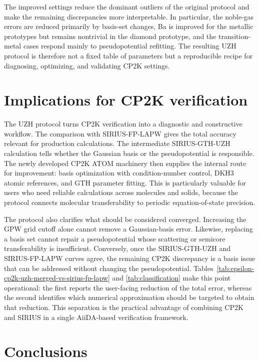 \documentclass[aps,prb,reprint,amsmath,amssymb,superscriptaddress,longbibliography,floatfix]{revtex4-2}
\begin{document}
The improved settings reduce the dominant outliers of the original protocol and make the remaining discrepancies more interpretable. In particular, the noble-gas errors are reduced primarily by basis-set changes, Ba is improved for the metallic prototypes but remains nontrivial in the diamond prototype, and the transition-metal cases respond mainly to pseudopotential refitting. The resulting UZH protocol is therefore not a fixed table of parameters but a reproducible recipe for diagnosing, optimizing, and validating CP2K settings.

\section{Implications for CP2K verification}

The UZH protocol turns CP2K verification into a diagnostic and constructive workflow. The comparison with SIRIUS-FP-LAPW gives the total accuracy relevant for production calculations. The intermediate SIRIUS-GTH-UZH calculation tells whether the Gaussian basis or the pseudopotential is responsible. The newly developed CP2K ATOM machinery then supplies the internal route for improvement: basis optimization with condition-number control, DKH3 atomic references, and GTH parameter fitting. This is particularly valuable for users who need reliable calculations across molecules and solids, because the protocol connects molecular transferability to periodic equation-of-state precision.

The protocol also clarifies what should be considered converged. Increasing the GPW grid cutoff alone cannot remove a Gaussian-basis error. Likewise, replacing a basis set cannot repair a pseudopotential whose scattering or semicore transferability is insufficient. Conversely, once the SIRIUS-GTH-UZH and SIRIUS-FP-LAPW curves agree, the remaining CP2K discrepancy is a basis issue that can be addressed without changing the pseudopotential. Tables~\ref{tab:epsilon-cp2k-uzh-merged-vs-sirius-fp-lapw} and \ref{tab:classification} make this point operational: the first reports the user-facing reduction of the total error, whereas the second identifies which numerical approximation should be targeted to obtain that reduction. This separation is the practical advantage of combining CP2K and SIRIUS in a single AiiDA-based verification framework.

\section{Conclusions}
\end{document}
